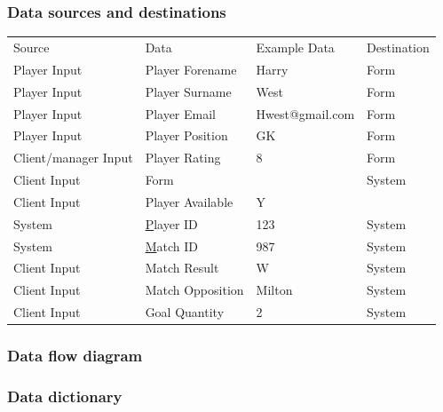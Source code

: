 \subsubsection{Data sources and destinations}

\begin{table}[]
\centering

\label{my-label}
\begin{tabular}{llll}
Source               & Data             & Example Data    & Destination \\
Player Input         & Player Forename  & Harry           & Form        \\
Player Input         & Player Surname   & West            & Form        \\
Player Input         & Player Email     & Hwest@gmail.com & Form        \\
Player Input         & Player Position  & GK              & Form        \\
Client/manager Input & Player Rating    & 8               & Form        \\
Client Input         & Form             &                 & System      \\
Client Input         & Player Available    & Y               &             \\
System               & {\ul Player ID}  & 123             & System      \\
System               & {\ul Match ID}   & 987             & System      \\
Client Input         & Match Result     & W               & System      \\
Client Input         & Match Opposition & Milton          & System      \\
Client Input         & Goal Quantity    & 2               & System     
\end{tabular}
\end{table}

\subsubsection{Data flow diagram}

\subsubsection{Data dictionary}

